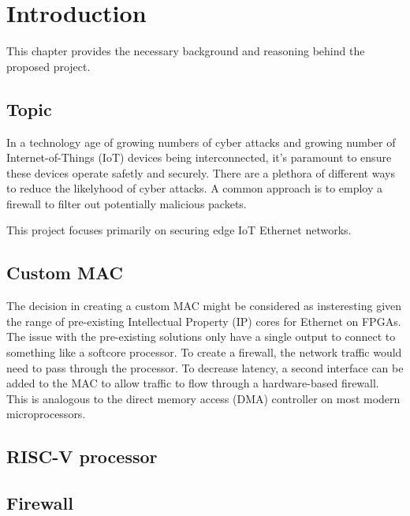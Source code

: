 \chapter[Introduction]{Introduction}
\label{Chap:Intro}




This chapter provides the necessary background and reasoning behind the proposed project. 
\section{Topic}


In a technology age of growing numbers of cyber attacks and growing number of Internet-of-Things (IoT) devices being interconnected, it's 
paramount to ensure these devices operate safetly and securely. There are a plethora of different ways to reduce the likelyhood of cyber attacks.
A common approach is to employ a firewall to filter out potentially malicious packets. 

This project focuses primarily on securing edge IoT Ethernet networks. 


\section{Custom MAC}
The decision in creating a custom MAC might be considered as insteresting given the range of pre-existing Intellectual 
Property (IP) cores for Ethernet on FPGAs. The issue with the pre-existing solutions only have a single output to connect to something like a softcore
processor. To create a firewall, the network traffic would need to pass through the processor. To decrease latency, a second interface can be added 
to the MAC to allow traffic to flow through a hardware-based firewall. This is analogous to the direct memory access (DMA) controller on most modern 
microprocessors. 


\section{RISC-V processor}


\section{Firewall}

